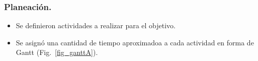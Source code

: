 
\subsubsection{Planeación.}
\begin{itemize}
	\item Se definieron actividades a realizar para el objetivo.
	\item Se asignó una cantidad de tiempo aproximadoa a cada actividad en forma de Gantt (Fig.~{\ref{fig_ganttA}}).
\end{itemize}
